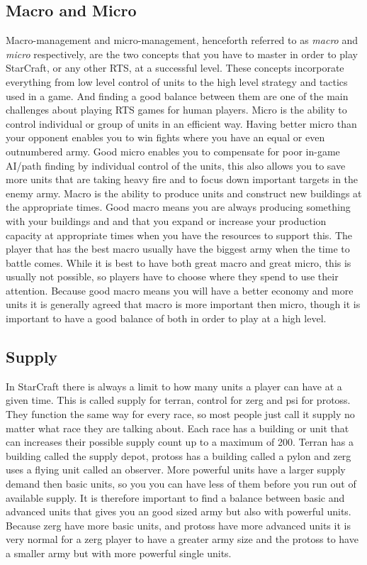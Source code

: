 \subsection{Macro and Micro}
Macro-management and micro-management, henceforth referred to as \textit{macro}
and \textit{micro} respectively, are the two concepts that you have to master
in order to play StarCraft, or any other RTS, at a successful level. These
concepts incorporate everything from low level control of units to the high
level strategy and tactics used in a game. And finding a good balance between
them are one of the main challenges about playing RTS games for human players.
Micro is the ability to control individual or group of units in an efficient
way. Having better micro than your opponent enables you to win fights where you
have an equal or even outnumbered army. Good micro enables you to 
compensate for poor in-game AI/path finding by individual control of the
units, this also allows you to save more units that are taking heavy fire and to
focus down important targets in the enemy army. Macro is the ability to produce
units and construct new buildings at the appropriate times. Good macro means you
are always producing something with your buildings and and that you expand or
increase your production capacity at appropriate times when you have the
resources to support this. The player that has the best macro usually have the
biggest army when the time to battle comes. While it is best to have both great
macro and great micro, this is usually not possible, so players have to choose
where they spend to use their attention. Because good macro means you will have
a better economy and more units it is generally agreed that macro is more
important then micro, though it is important to have a good balance of both in
order to play at a high level.

\subsection{Supply}
In StarCraft there is always a limit to how many units a player can have at a
given time. This is called supply for terran, control for zerg and psi for
protoss. They function the same way for every race, so most people just call it
supply no matter what race they are talking about. Each race has a building or
unit that can increases their possible supply count up to a maximum of 200.
Terran has a building called the supply depot, protoss has a building called a
pylon and zerg uses a flying unit called an observer. More powerful units have a
larger supply demand then basic units, so you you can have less of them before
you run out of available supply. It is therefore important to find a balance
between basic and advanced units that gives you an good sized army but also with
powerful units. Because zerg have more basic units, and protoss have more
advanced units it is very normal for a zerg player to have a greater army size
and the protoss to have a smaller army but with more powerful single units.
 
